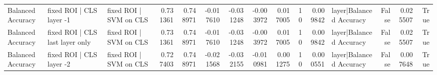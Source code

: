 \begin{table}
\begin{tabular}{lllrrrrrrrrlrrr}
Balanced Accuracy & fixed ROI | CLS layer -1 & fixed ROI | SVM on CLS & 0.731361 & 0.748971 & -0.017610 & -0.031248 & -0.003972 & 0.017005 & 10 & 0.009842 & layer|Balanced Accuracy & False & 0.025507 & True \\
Balanced Accuracy & fixed ROI | CLS last layer only & fixed ROI | SVM on CLS & 0.731361 & 0.748971 & -0.017610 & -0.031248 & -0.003972 & 0.017005 & 10 & 0.009842 & layer|Balanced Accuracy & False & 0.025507 & True \\
Balanced Accuracy & fixed ROI | CLS layer -2 & fixed ROI | SVM on CLS & 0.727403 & 0.748971 & -0.021568 & -0.032155 & -0.010981 & 0.001275 & 10 & 0.000551 & layer|Balanced Accuracy & False & 0.007648 & True \\
\bottomrule
\end{tabular}
\end{table}
